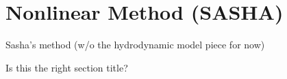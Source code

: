 \section{Nonlinear Method \textbf(SASHA)}

Sasha's method (w/o the hydrodynamic model piece for now)

Is this the right section title?
